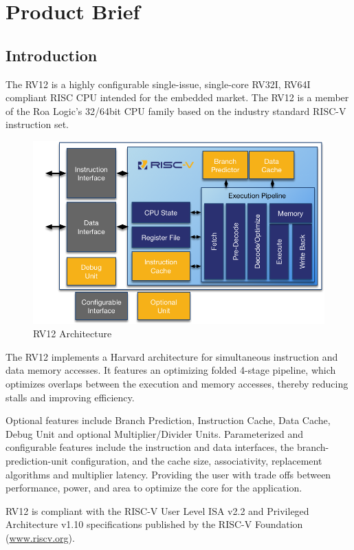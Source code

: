 \chapter{Product Brief}

\section{Introduction}\label{introduction}

The RV12 is a highly configurable single-issue, single-core RV32I, RV64I
compliant RISC CPU intended for the embedded market. The RV12 is a
member of the Roa Logic's 32/64bit CPU family based on the industry
standard RISC-V instruction set.

\begin{figure}[hbt]
  \includegraphics{assets/img/RV12_Arch}
  \caption{RV12 Architecture}
\end{figure}

The RV12 implements a Harvard architecture for simultaneous instruction
and data memory accesses. It features an optimizing folded 4-stage
pipeline, which optimizes overlaps between the execution and memory
accesses, thereby reducing stalls and improving efficiency.

Optional features include Branch Prediction, Instruction Cache, Data
Cache, Debug Unit and optional Multiplier/Divider Units. Parameterized
and configurable features include the instruction and data interfaces,
the branch-prediction-unit configuration, and the cache size,
associativity, replacement algorithms and multiplier latency. Providing
the user with trade offs between performance, power, and area to
optimize the core for the application.

RV12 is compliant with the RISC-V User Level ISA v2.2 and Privileged
Architecture v1.10 specifications published by the RISC-V Foundation
(\href{http://www.riscv.org}{www.riscv.org}).

